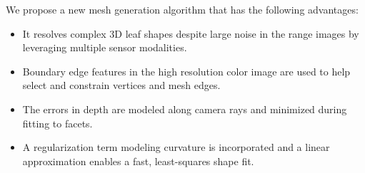 We propose a new mesh generation algorithm that has the following advantages:
\begin{itemize}
\item It resolves complex $3$D leaf shapes despite large noise in the range images by leveraging multiple sensor modalities.  
\item Boundary edge features in the high resolution color image are used to help select and constrain vertices and mesh edges.  
\item The errors in depth are modeled along camera rays and minimized during fitting to facets.  
\item A regularization term modeling curvature is incorporated and a linear approximation enables a fast, least-squares shape fit.
\end{itemize}




